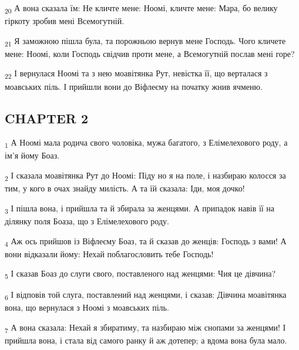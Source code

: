 \begin{tcolorbox}
\textsubscript{20} А вона сказала їм: Не кличте мене: Ноомі, кличте мене: Мара, бо велику гіркоту зробив мені Всемогутній.
\end{tcolorbox}
\begin{tcolorbox}
\textsubscript{21} Я заможною пішла була, та порожньою вернув мене Господь. Чого кличете мене: Ноомі, коли Господь свідчив проти мене, а Всемогутній послав мені горе?
\end{tcolorbox}
\begin{tcolorbox}
\textsubscript{22} І вернулася Ноомі та з нею моавітянка Рут, невістка її, що верталася з моавських піль. І прийшли вони до Віфлеєму на початку жнив ячменю.
\end{tcolorbox}
\subsection{CHAPTER 2}
\begin{tcolorbox}
\textsubscript{1} А Ноомі мала родича свого чоловіка, мужа багатого, з Елімелехового роду, а ім'я йому Боаз.
\end{tcolorbox}
\begin{tcolorbox}
\textsubscript{2} І сказала моавітянка Рут до Ноомі: Піду но я на поле, і назбираю колосся за тим, у кого в очах знайду милість. А та їй сказала: Іди, моя дочко!
\end{tcolorbox}
\begin{tcolorbox}
\textsubscript{3} І пішла вона, і прийшла та й збирала за женцями. А припадок навів її на ділянку поля Боаза, що з Елімелехового роду.
\end{tcolorbox}
\begin{tcolorbox}
\textsubscript{4} Аж ось прийшов із Віфлеєму Боаз, та й сказав до женців: Господь з вами! А вони відказали йому: Нехай поблагословить тебе Господь!
\end{tcolorbox}
\begin{tcolorbox}
\textsubscript{5} І сказав Боаз до слуги свого, поставленого над женцями: Чия це дівчина?
\end{tcolorbox}
\begin{tcolorbox}
\textsubscript{6} І відповів той слуга, поставлений над женцями, і сказав: Дівчина моавітянка вона, що вернулася з Ноомі з моавських піль.
\end{tcolorbox}
\begin{tcolorbox}
\textsubscript{7} А вона сказала: Нехай я збиратиму, та назбираю між снопами за женцями! І прийшла вона, і стала від самого ранку й аж дотепер; а вдома вона була мало.
\end{tcolorbox}
